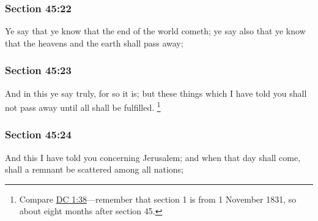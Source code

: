 	\subsubsection{Section 45:22} %
		\label{DC45-22}

		Ye say that ye know that the end of the world cometh; ye say also that ye know that the heavens and the earth shall pass away;


	\subsubsection{Section 45:23} %
		\label{DC45-23}

		And in this ye say truly, for so it is; but these things which I have told you shall not pass away until all shall be fulfilled.%
			\footnote{%
				Compare \hyperref[DC1-38]{DC 1:38}---remember that section 1 is from 1 November 1831, so about eight months after section 45.
				}


	\subsubsection{Section 45:24} %
		\label{DC45-24}

		And this I have told you concerning Jerusalem; and when that day shall come, shall a remnant be scattered among all nations;


